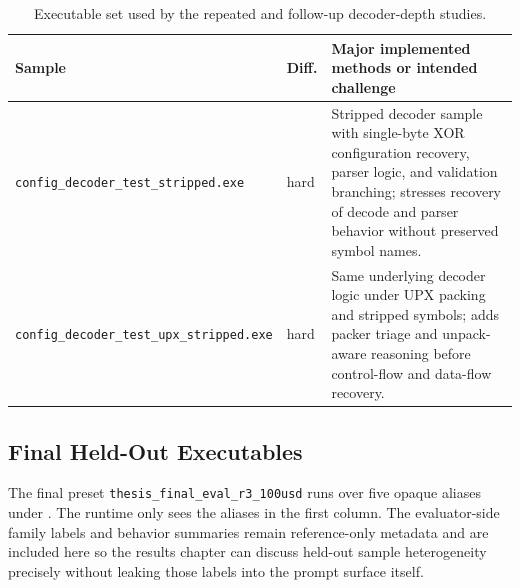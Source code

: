 \begin{table}[p]
\centering
\small
\begin{tabular}{p{} p{} p{}}
\textbf{Sample} & \textbf{Diff.} & \textbf{Major implemented methods or intended challenge} \\
\hline
\texttt{config\_decoder\_test\_stripped.exe} & hard & Stripped decoder sample with single-byte XOR configuration recovery, parser logic, and validation branching; stresses recovery of decode and parser behavior without preserved symbol names. \\
\texttt{config\_decoder\_test\_upx\_stripped.exe} & hard & Same underlying decoder logic under UPX packing and stripped symbols; adds packer triage and unpack-aware reasoning before control-flow and data-flow recovery. \\
\end{tabular}
\caption{Executable set used by the repeated and follow-up decoder-depth studies.}
\label{tab:depth-sweep-samples}
\end{table}

\subsection{Final Held-Out Executables}

The final preset \texttt{thesis\_final\_eval\_r3\_100usd} runs over five opaque aliases under . The runtime only sees the aliases in the first column. The evaluator-side family labels and behavior summaries remain reference-only metadata and are included here so the results chapter can discuss held-out sample heterogeneity precisely without leaking those labels into the prompt surface itself.

